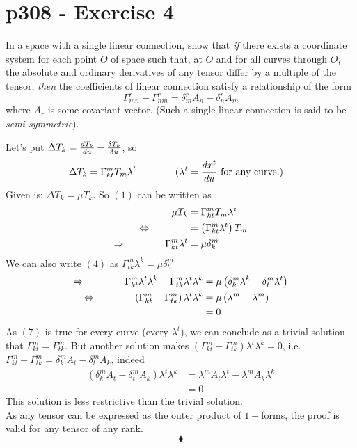 \section{p308 - Exercise 4}
\begin{tcolorbox}
In a space with a single linear connection, show that \textit{if} there exists a coordinate system for each point $O$ of space such that, at $O$ and for all curves through $O$, the absolute and ordinary derivatives of any tensor differ by a multiple of the tensor, \textit{then }the coefficients of linear connection satisfy a relationship of the form 
$$\Gamma^r_{mn}-\Gamma^r_{nm} = \delta^r_mA_n - \delta^r_n A_m$$
where $A_r$ is some covariant vector. (Such a single linear connection is said to be \textit{semi-symmetric}).
\end{tcolorbox}
Let's put $\Delta T_k = \dv{T_k}{u} - \fdv{T_k}{u}$, so
\begin{align}
\Delta T_k&= \Gamma^m_{kt}T_m\lambda^t\quad\quad\quad\quad (\lambda^t = \dv{x^t}{u}\text{ for any curve.})
\end{align}
Given is: $ \Delta T_k = \mu T_k$. So $(1)$ can be written as 
\begin{align}
\mu T_k&= \Gamma^m_{kt}T_m\lambda^t\\
\Leftrightarrow\quad\quad\quad\quad &= \left(\Gamma^m_{kt}\lambda^t\right)T_m\\
\Rightarrow\quad\quad\quad\quad \Gamma^m_{kt}\lambda^t &= \mu \delta^m_k
\end{align}
We can also write $(4)$ as $ \Gamma^m_{tk}\lambda^k = \mu \delta^m_t$
\begin{align}
\Rightarrow\quad\quad\quad\quad \Gamma^m_{kt}\lambda^t\lambda^k-\Gamma^m_{tk}\lambda^t\lambda^k &= \mu \left(\delta^m_k\lambda^k- \delta^m_t\lambda^t\right)\\
\Leftrightarrow\quad\quad\quad\quad \left(\Gamma^m_{kt}-\Gamma^m_{tk}\right)\lambda^t\lambda^k &= \mu \left(\lambda^m- \lambda^m\right)\\
&=0
\end{align}
As $(7)$ is true for every curve (every $\lambda^t$), we can conclude as a  trivial solution that $\Gamma^m_{kt}=\Gamma^m_{tk}$. But another solution makes $\left(\Gamma^m_{kt}-\Gamma^m_{tk}\right)\lambda^t\lambda^k  =0$, i.e. $ \Gamma^m_{kt}-\Gamma^m_{tk}= \delta^m_kA_t - \delta^m_tA_k $, indeed
\begin{align*}
\left(\delta^m_kA_t - \delta^m_tA_k\right)\lambda^t\lambda^k &=  \lambda^mA_t\lambda^t-\lambda^mA_k\lambda^k\\
&=0
\end{align*}
This  solution is less restrictive than the trivial solution. \\
As any tensor can be expressed as the outer product of $1-$forms, the proof is valid for any tensor of any rank.
$$\blacklozenge$$\\
\newpage



